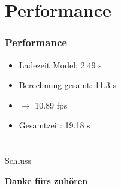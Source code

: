 \documentclass[ignorenonframetext,naustrian,12pt,t]{beamer}
\begin{document}
\section{Performance}
\begin{frame}
	\frametitle{Performance}
		\begin{itemize}[label={\color{myTitleColour}\textbullet}]
		\item Ladezeit Model: 2.49 s
		\item Berechnung gesamt: 11.3 s 
		\item $\rightarrow$ 10.89 fps 
		\item Gesamtzeit: 19.18 s
		\end{itemize}
\end{frame}

\section{}
\begin{frame}{Schluss}
   \begin{center}
      \vspace{1cm}
      \Huge \textbf{Danke fürs zuhören} \\
   \end{center}
\end{frame}
\end{document}
